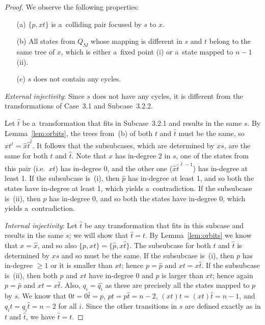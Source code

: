 \documentclass{amsart}
\renewcommand{\ge}{\geqslant}
\newcommand{\e}[1]{\hat{#1}}
\begin{document}
\begin{proof}
We observe the following properties:
\begin{enumerate}
\item[(a)] $\{p, xt\}$ is a~colliding pair focused by $s$ to $x$.

\item[(b)] All states from $Q_M$ whose mapping is different in $s$ and $t$ belong to the same tree of $x$,
which is either a~fixed point (i) or a~state mapped to $n-1$ (ii).

\item[(c)] $s$ does not contain any cycles.
\end{enumerate}

\textit{External injectivity}:
Since $s$ does not have any cycles, it is different from the transformations of Case~3.1 and Subcase~3.2.2.

Let $\e{t}$ be a~transformation that fits in Subcase~3.2.1 and results in the same $s$.
By Lemma~\ref{lem:orbits}, the trees from~(b) of both $t$ and $\e{t}$ must be the same, so $xt^\ell = \e{x}\e{t}^{\e{\ell}}$.
It follows that the subsubcases, which are determined by $xs$, are the same for both $t$ and $\e{t}$.
Note that $x$ has in-degree 2 in $s$, one of the states from this pair (i.e.\ $xt$) has in-degree $0$, and the other one ($\e{x}\e{t}^{\e{\ell}-1}$) has in-degree at least 1.
If the subsubcase is~(i), then $\e{p}$ has in-degree at least 1, and so both the states have in-degree at least 1, which yields a~contradiction.
If the subsubcase is~(ii), then $p$ has in-degree 0, and so both the states have in-degree 0, which yields a~contradiction.

\textit{Internal injectivity}:
Let $\e{t}$ be any transformation that fits in this subcase and results in the same $s$; we will show that $\e{t}=t$.
By Lemma~\ref{lem:orbits} we know that $x = \e{x}$, and so also $\{p,xt\} = \{\e{p},x\e{t}\}$.
The subsubcase for both $t$ and $\e{t}$ is determined by $xs$ and so must be the same.
If the subsubcase is~(i), then $p$ has in-degree $\ge 1$ or it is smaller than $xt$; hence $p = \e{p}$ and $xt = x\e{t}$.
If the subsubcase is~(ii), then both $p$ and $xt$ have in-degree $0$ and $p$ is larger than $xt$; hence again $p = \e{p}$ and $xt = x\e{t}$.
Also, $q_i = \e{q_i}$ as these are precisely all the states mapped to $p$ by $s$.
We know that $0t = 0\e{t} = p$, $pt = p\e{t} = n-2$, $(xt)t = (xt)\e{t} = n-1$, and $q_i t = q_i \e{t} = n-2$ for all $i$.
Since the other transitions in $s$ are defined exactly as in $t$ and $\e{t}$, we have $\e{t}=t$.


\end{proof}
\end{document}
